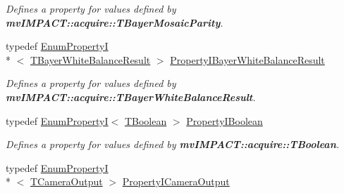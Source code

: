 \begin{DoxyCompactItemize}
\begin{DoxyCompactList}\small\item\em Defines a property for values defined by {\bfseries mv\+I\+M\+P\+A\+C\+T\+::acquire\+::\+T\+Bayer\+Mosaic\+Parity}. \end{DoxyCompactList}\item 
\hypertarget{group___common_interface_ga8d7bb9e61170b53191fa8169cf685e7d}{typedef \hyperlink{classmv_i_m_p_a_c_t_1_1acquire_1_1_enum_property_i}{Enum\+Property\+I}\\*
$<$ \hyperlink{group___common_interface_gac25746f6cbcf893d3ca308d3e978f39d}{T\+Bayer\+White\+Balance\+Result} $>$ \hyperlink{group___common_interface_ga8d7bb9e61170b53191fa8169cf685e7d}{Property\+I\+Bayer\+White\+Balance\+Result}}\label{group___common_interface_ga8d7bb9e61170b53191fa8169cf685e7d}

\begin{DoxyCompactList}\small\item\em Defines a property for values defined by {\bfseries mv\+I\+M\+P\+A\+C\+T\+::acquire\+::\+T\+Bayer\+White\+Balance\+Result}. \end{DoxyCompactList}\item 
\hypertarget{group___common_interface_ga44f9437e24b21b6c93da9039ec6786aa}{typedef \hyperlink{classmv_i_m_p_a_c_t_1_1acquire_1_1_enum_property_i}{Enum\+Property\+I}$<$ \hyperlink{group___common_interface_ga43c995be18b0dde1eeb4a16849c58968}{T\+Boolean} $>$ \hyperlink{group___common_interface_ga44f9437e24b21b6c93da9039ec6786aa}{Property\+I\+Boolean}}\label{group___common_interface_ga44f9437e24b21b6c93da9039ec6786aa}

\begin{DoxyCompactList}\small\item\em Defines a property for values defined by {\bfseries mv\+I\+M\+P\+A\+C\+T\+::acquire\+::\+T\+Boolean}. \end{DoxyCompactList}\item 
\hypertarget{group___common_interface_ga48585b26ebc31ccee54f34c7d6bbdda3}{typedef \hyperlink{classmv_i_m_p_a_c_t_1_1acquire_1_1_enum_property_i}{Enum\+Property\+I}\\*
$<$ \hyperlink{group___common_interface_gad85678f02bc0deb0eee9f7ce67644da7}{T\+Camera\+Output} $>$ \hyperlink{group___common_interface_ga48585b26ebc31ccee54f34c7d6bbdda3}{Property\+I\+Camera\+Output}}\label{group___common_interface_ga48585b26ebc31ccee54f34c7d6bbdda3}


\end{DoxyCompactItemize}
